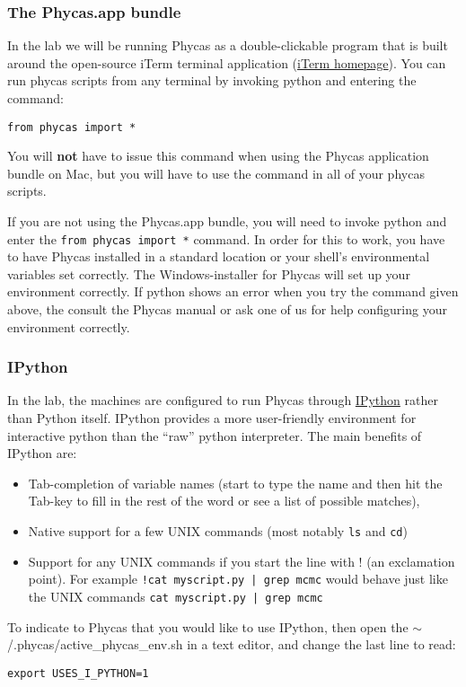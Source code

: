 \documentclass{article}
\newcommand{\cmd}[1]{\texttt{#1}\xspace}
\newcommand{\phycas}{Phycas\xspace}
\newcommand{\localfile}[1]{\textsf{#1}\xspace}
\begin{document}
\subsubsection{The Phycas.app bundle}
In the lab we will be running \phycas as a double-clickable program that is built around the open-source iTerm terminal application (\href{http://iterm.sourceforge.net/}{iTerm homepage}).
You can run phycas scripts from any terminal by invoking python and entering the command:
\begin{verbatim}
from phycas import *
\end{verbatim}
You will {\bf not} have to issue this command when using the \phycas application bundle on Mac, but you will have to use the command in all of your phycas scripts.

If you are not using the Phycas.app bundle, you will need to invoke python and enter the \cmd{from phycas import *} command.
In order for this to work, you have to have \phycas installed in a standard location or your shell's environmental variables set correctly.
The Windows-installer for \phycas will set up your environment correctly.
If python shows an error when you try the command given above, the consult the \phycas manual or ask one
of us for help configuring your environment correctly.

\subsubsection{IPython}
In the lab, the machines are configured to run \phycas through \href{http://ipython.scipy.org/moin/}{IPython} rather than Python itself.  
IPython provides a more user-friendly environment for interactive python than the ``raw'' python interpreter.
The main benefits of IPython are:
\begin{itemize}
	\item Tab-completion of variable names (start to type the name and then hit the Tab-key to fill in the rest of the word or see a list of possible matches),
	\item Native support for a few UNIX commands (most notably \cmd{ls} and \cmd{cd})
	\item Support for any UNIX commands if you start the line with ! (an exclamation point). For example \cmd{!cat myscript.py | grep mcmc} would behave just like the UNIX commands \cmd{cat myscript.py | grep mcmc}
\end{itemize}
To indicate to \phycas that you would like to use IPython, then open the \localfile{$\sim$/.phycas/active\_phycas\_env.sh} 
in a text editor, and change the last line to read:
\begin{verbatim}
export USES_I_PYTHON=1
\end{verbatim}
 
\end{document}
